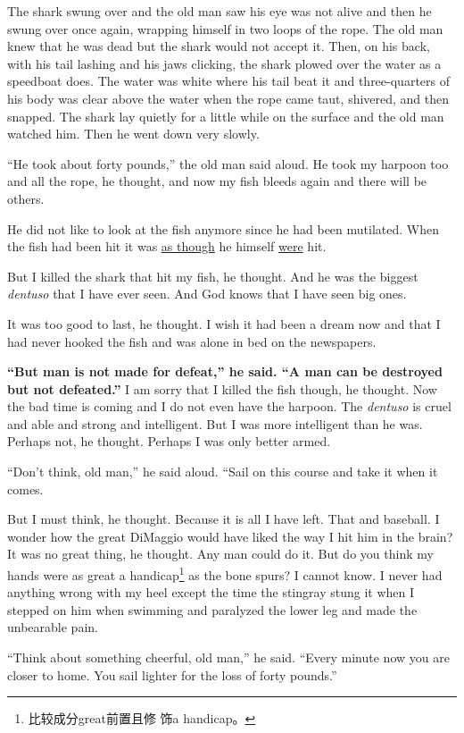 The shark swung over and the old man saw his eye was not alive and then he
swung over once again, wrapping himself in two loops of the rope. The old
man knew that he was dead but the shark would not accept it. Then, on his
back, with his tail lashing and his jaws clicking, the shark \gls{plowed}
over the water as a \gls{speedboat} does. The water was white where his tail
beat it and three-\glspl{quarter} of his body was clear above the water when the
rope came taut, \gls{shivered}, and then \gls{snapped}. The shark lay
quietly for a little while on the surface and the old man watched him. Then
he went down very slowly.

``He took about forty pounds,'' the old man said aloud. He took my harpoon
too and all the rope, he thought, and now my fish bleeds again and there
will be others.

He did not like to look at the fish anymore since he had been
\gls{mutilated}. When the fish had been hit it was \uline{as though} he himself
\uline{were} hit.

But I killed the shark that hit my fish, he thought. And he was the biggest
\emph{dentuso} that I have ever seen. And God knows that I have seen big ones.

It was too good to last, he thought. I wish it had been a dream now and
that I had never hooked the fish and was alone in bed on the newspapers.

\textbf{``But man is not made for defeat,'' he said. ``A man can be
  destroyed but not defeated.''} I am sorry that I killed the fish though,
he thought. Now the bad time is coming and I do not even have the harpoon.
The \emph{dentuso} is cruel and able and strong and intelligent. But I was
more intelligent than he was. Perhaps not, he thought. Perhaps I was only
better armed.

``Don't think, old man,'' he said aloud. ``Sail on this course and take it
when it comes.

But I must think, he thought. Because it is all I have left. That and
baseball. I wonder how the great DiMaggio would have liked the way I hit him
in the brain? It was no great thing, he thought. Any man could do it. But do
you think my hands were as great a handicap\footnote{比较成分great前置且修
  饰a handicap。} as the bone spurs? I cannot know. I never had anything
wrong with my heel except the time the \gls{stingray} \gls{stung} it when I
stepped on him when swimming and \gls{paralyzed} the lower leg and made the
\gls{unbearable} pain.

``Think about something cheerful, old man,'' he said. ``Every minute now you
are closer to home. You sail lighter for the loss of forty pounds.''

